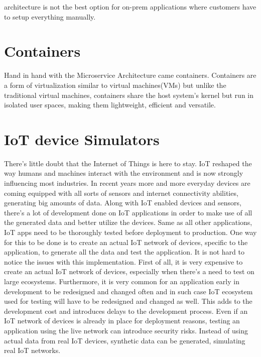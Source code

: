 architecture is not the best option for on-prem applications where customers have to setup everything manually.\cite{whenmicroarebad}

\section{Containers}

Hand in hand with the Microservice Architecture came containers. Containers are a form of virtualization similar to virtual machines(VMs) but unlike the traditional virtual machines, containers share the host system's kernel but run in isolated user spaces, making them lightweight, efficient and versatile. 

\section{IoT device Simulators}

There's little doubt that the Internet of Things is here to stay. IoT reshaped the way humans and machines interact with the environment and is now strongly influencing most industries. In recent years more and more everyday devices are coming equipped with all sorts of sensors and internet connectivity abilities, generating big amounts of data. Along with IoT enabled devices and sensors, there's a lot of development done on IoT applications in order to make use of all the generated data and better utilize the devices. Same as all other applications, IoT apps need to be thoroughly tested before deployment to production. One way for this to be done is to create an actual IoT network of devices, specific to the application, to generate all the data and test the application. It is not hard to notice the issues with this implementation. First of all, it is very expensive to create an actual IoT network of devices, especially when there's a need to test on large ecosystems. Furthermore, it is very common for an application early in development to be redesigned and changed often and in such case IoT ecosystem used for testing will have to be redesigned and changed as well. This adds to the development cost and introduces delays to the development process. Even if an IoT network of devices is already in place for deployment reasons, testing an application using the live network can introduce security risks. Instead of using actual data from real IoT devices, synthetic data can be generated, simulating real IoT networks. 


